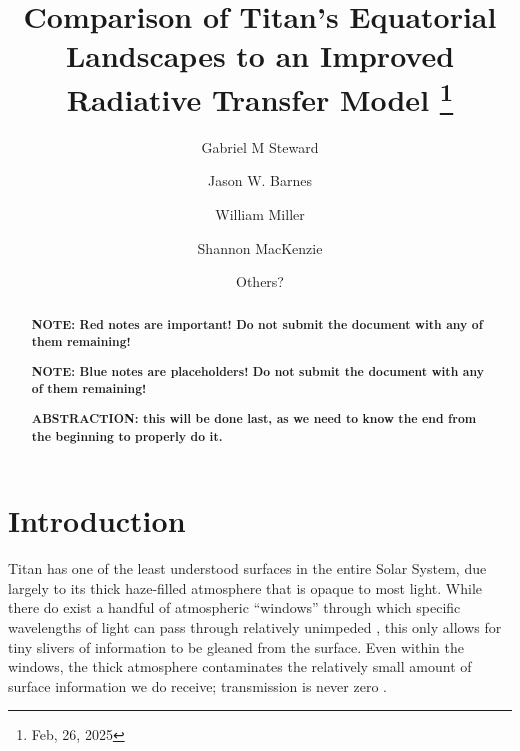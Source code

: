 \documentclass[twocolumn,linenumbers]{aastex631}
\begin{document}
\title{Comparison of Titan's Equatorial Landscapes to an Improved Radiative Transfer Model
\footnote{Feb, 26, 2025}}

\author[0000-0002-8482-4669]{Gabriel M Steward}

\author{Jason W. Barnes}

\author{William Miller}

\author{Shannon MacKenzie}

\author{Others?}

\begin{abstract}

\textbf{\color{red}NOTE: Red notes are important! Do not submit the document with any of them remaining!\color{black}}

\textbf{\color{blue}NOTE: Blue notes are placeholders! Do not submit the document with any of them remaining!\color{black}}

\textbf{\color{red}ABSTRACTION: this will be done last, as we need to know the end from the beginning to properly do it.\color{black}}

\end{abstract}


\section{Introduction} \label{sec:intro}

Titan has one of the least understood surfaces in the entire Solar System, due largely to its thick haze-filled atmosphere that is opaque to most light. While there do exist a handful of atmospheric ``windows'' through which specific wavelengths of light can pass through relatively unimpeded \citep{Barnes2007}, this only allows for tiny slivers of information to be gleaned from the surface. Even within the windows, the thick atmosphere contaminates the relatively small amount of surface information we do receive; transmission is never zero \citep{EsSayeh2023}. 
\end{document}
